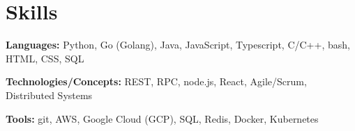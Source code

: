 \documentclass{resume}
\begin{document}
\section{Skills}

\textbf{Languages:} Python, Go (Golang), Java, JavaScript, Typescript, C/C++, bash, HTML, CSS, SQL

\textbf{Technologies/Concepts:} REST, RPC, node.js, React, Agile/Scrum, Distributed Systems

\textbf{Tools:} git, AWS, Google Cloud (GCP), SQL, Redis, Docker, Kubernetes
\end{document}
